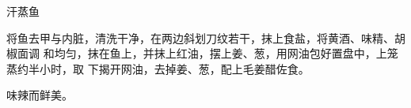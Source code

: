 \begin{recipe}{汗蒸鱼}

\ingredients


\cooking

将鱼去甲与内脏，清洗干净，在两边斜划刀纹若干，抹上食盐，将黄酒、味精、胡椒面调
和均匀，抹在鱼上，并抹上红油，摆上姜、葱，用网油包好置盘中，上笼蒸约半小时，取
下揭开网油，去掉姜、葱，配上毛姜醋佐食。

\notes

味辣而鲜美。

\end{recipe}

